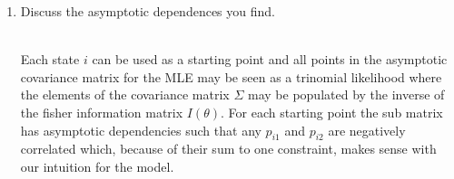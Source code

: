 \documentclass{article} %
\begin{document}
\begin{enumerate}
\begin{enumerate}
  \item Discuss the asymptotic dependences you find.

~\\
Each state $i$ can be used as a starting point and all points in the
asymptotic covariance matrix for the MLE may be seen as a trinomial likelihood
where the elements of the covariance matrix $\Sigma$ may be populated by the
inverse of the fisher information matrix $I(\theta)$. For each starting point
the sub matrix has asymptotic dependencies such that any $p_{i1}$ and $p_{i2}$
are negatively correlated which, because of their sum to one constraint, makes
sense with our intuition for the model.
  \end{enumerate}
\end{enumerate}
\end{document}
